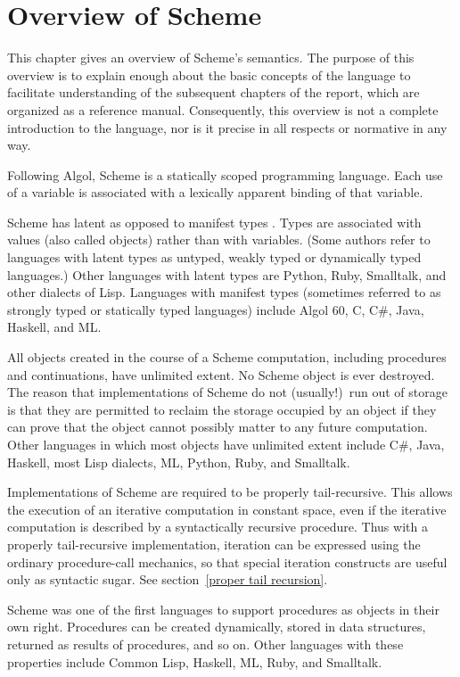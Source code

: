 \chapter{Overview of Scheme}
\label{semanticchapter}

This chapter gives an overview of Scheme's semantics.
The purpose of this overview is to explain
enough about the basic concepts of the language to facilitate
understanding of the subsequent chapters of the report, which are
organized as a reference manual.  Consequently, this overview is
not a complete introduction to the language, nor is it precise
in all respects or normative in any way.

\vest Following Algol, Scheme is a statically scoped programming
language.  Each use of a variable is associated with a lexically
apparent binding of that variable.

\vest Scheme has latent as opposed to manifest types
\cite{WaiteGoos}.  Types
are associated with values (also called objects) rather than
with variables.  (Some authors refer to languages with latent types as
untyped, weakly typed or dynamically typed languages.)  Other languages with
latent types are Python, Ruby, Smalltalk, and other dialects of Lisp.  Languages
with manifest types (sometimes referred to as strongly typed or
statically typed languages) include Algol 60, C, C\#, Java, Haskell, and ML.

\vest All objects created in the course of a Scheme computation, including
procedures and continuations, have unlimited extent.
No Scheme object is ever destroyed.  The reason that
implementations of Scheme do not (usually!)\ run out of storage is that
they are permitted to reclaim the storage occupied by an object if
they can prove that the object cannot possibly matter to any future
computation.  Other languages in which most objects have unlimited
extent include C\#, Java, Haskell, most Lisp dialects, ML, Python,
Ruby, and Smalltalk.

\vest Implementations of Scheme are required to be properly tail-recursive.
This allows the execution of an iterative computation in constant space,
even if the iterative computation is described by a syntactically
recursive procedure.  Thus with a properly tail-recursive implementation,
iteration can be expressed using the ordinary procedure-call
mechanics, so that special iteration constructs are useful only as
syntactic sugar.  See section~\ref{proper tail recursion}.

\vest Scheme was one of the first languages to support procedures as
objects in their own right.  Procedures can be created dynamically,
stored in data structures, returned as results of procedures, and so
on.  Other languages with these properties include Common Lisp,
Haskell, ML, Ruby, and Smalltalk.

